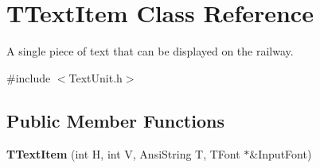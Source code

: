 \hypertarget{class_t_text_item}{}\section{T\+Text\+Item Class Reference}
\label{class_t_text_item}


A single piece of text that can be displayed on the railway.  




{\ttfamily \#include $<$Text\+Unit.\+h$>$}

\subsection*{Public Member Functions}
\begin{DoxyCompactItemize}
\item 
\mbox{\label{class_t_text_item_a666e6cdc359b2625c851d616a01dbef0}} 
{\bfseries T\+Text\+Item} (int H, int V, Ansi\+String T, T\+Font $\ast$\&Input\+Font)
\end{DoxyCompactItemize}
